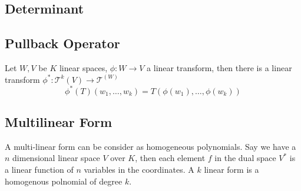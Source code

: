 \subsection{Determinant}

\subsection{Pullback Operator}
Let $W, V$ be $K$ linear spaces, $\phi : W \to V$ a linear transform,
then there is a linear transform $\phi^\ast : \mathcal T^k(V) \to \mathcal T^(W)$
$$\phi^\ast(T)(w_1, \dots, w_k) = T(\phi(w_1), \dots, \phi(w_k))$$

\subsection{Multilinear Form}
A multi-linear form can be consider as homogeneous polynomials.
Say we have a $n$ dimensional linear space $V$ over $K$, then each element $f$ in the dual space $V^\ast$
is a linear function of $n$ variables in the coordinates.
A $k$ linear form is a homogenous polnomial of degree $k$.
